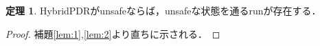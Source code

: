 \documentclass[a4paper]{jarticle}
\theoremstyle{definition}
\newtheorem{theorem}{定理}
\begin{document}
\begin{theorem}
  HybridPDRがunsafeならば，unsafeな状態を通るrunが存在する．
\end{theorem}

\begin{proof}
  補題\ref{lem:1},\ref{lem:2}より直ちに示される．
\end{proof}
\end{document}
